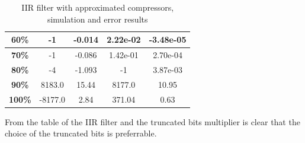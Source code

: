 \documentclass[a4paper]{article}
\begin{document}
\begin{table}[hbtp]
\begin{tabular}{|c|c|c|c|c|}
		\textbf{60\%}                                                                   & 		-1                                                                              & 		-0.014                                                                           & 2.22e-02                             &		 -3.48e-05                             \\ \hline
		\textbf{70\%}                                                                   & 		-1                                                                              & 		-0.086                                                                           & 1.42e-01                             &		 2.70e-04                              \\ \hline
		\textbf{80\%}                                                                   & 		-4                                                                              & 		-1.093                                                                           & -1                                   &		 3.87e-03                              \\ \hline
		\textbf{90\%}                                                                   & 		8183.0                                                                          & 		15.44                                                                            & 8177.0                               &		 10.95                                 \\ \hline
		\textbf{100\%}                                                                  & 		-8177.0                                                                         & 		2.84                                                                             & 371.04                               &		 0.63                                  \\ \hline
		\end{tabular}
		\caption{IIR filter with approximated compressors, simulation and error results}
		\label{tab:iir_sim}
	\end{table}

	From the table of the IIR filter and the truncated bits multiplier is clear that the choice of the truncated bits is preferrable.
\end{document}
